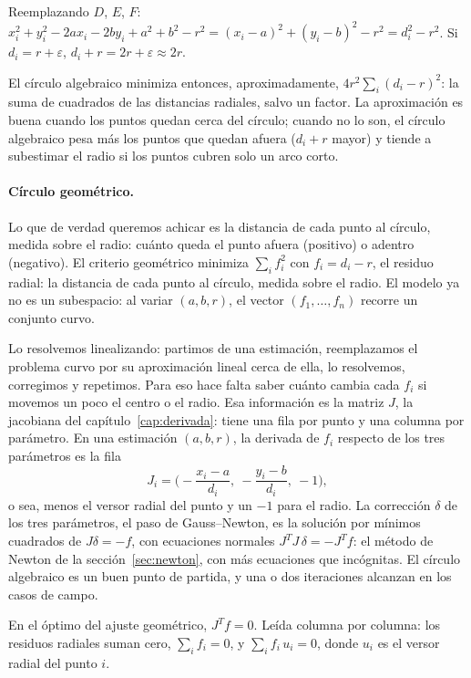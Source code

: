 \begin{demostracion}
Reemplazando \(D\), \(E\), \(F\):
\(x_i^2+y_i^2-2ax_i-2by_i+a^2+b^2-r^2=(x_i-a)^2+(y_i-b)^2-r^2=d_i^2-r^2\). Si
\(d_i=r+\varepsilon\), \(d_i+r=2r+\varepsilon\approx2r\).
\end{demostracion}

El círculo algebraico minimiza entonces, aproximadamente, \(4r^2\sum_i(d_i-r)^2\): la suma de
cuadrados de las distancias radiales, salvo un factor. La aproximación es buena cuando los
puntos quedan cerca del círculo; cuando no lo son, el círculo algebraico pesa más los puntos que quedan
afuera (\(d_i+r\) mayor) y tiende a subestimar el radio si los puntos cubren solo un arco
corto.

\paragraph{Círculo geométrico.} Lo que de verdad queremos achicar es la distancia de cada punto
al círculo, medida sobre el radio: cuánto queda el punto afuera (positivo) o adentro
(negativo). El criterio geométrico minimiza
\(\sum_if_i^2\) con \(f_i=d_i-r\), el residuo radial: la distancia de cada punto al
círculo, medida sobre el radio. El modelo ya no es un subespacio: al variar \((a,b,r)\), el
vector \((f_1,\dots,f_n)\) recorre un conjunto curvo.

Lo resolvemos linealizando: partimos de una estimación, reemplazamos el problema curvo por su
aproximación lineal cerca de ella, lo resolvemos, corregimos y
repetimos. Para eso hace falta saber cuánto cambia cada \(f_i\) si movemos un poco el centro o
el radio. Esa información es la matriz \(J\), la jacobiana del capítulo~\ref{cap:derivada}:
tiene una fila por punto y una columna por parámetro. En una estimación \((a,b,r)\), la
derivada de \(f_i\) respecto de los tres parámetros es la fila
\[
  J_i=\Big(-\frac{x_i-a}{d_i},\ -\frac{y_i-b}{d_i},\ -1\Big),
\]
o sea, menos el versor radial del punto y un \(-1\) para el radio. La corrección \(\delta\) de
los tres parámetros, el paso de Gauss--Newton, es la solución por mínimos cuadrados de
\(J\delta=-f\), con ecuaciones normales
\(J^TJ\,\delta=-J^Tf\): el método de Newton de la sección~\ref{sec:newton}, con más
ecuaciones que incógnitas. El círculo algebraico es un buen punto de partida, y una o dos
iteraciones alcanzan en los casos de campo.

\begin{proposicion}\label{prop:cp-circulo-optimo}
En el óptimo del ajuste geométrico, \(J^Tf=0\). Leída columna por columna: los residuos
radiales suman cero, \(\sum_if_i=0\), y \(\sum_if_i\,u_i=0\), donde \(u_i\) es el versor
radial del punto \(i\).
\end{proposicion}

